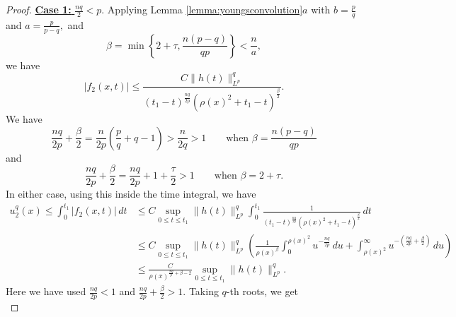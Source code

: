 \documentclass[12pt]{amsart}
\renewcommand{\1}{{\mathbf 1}}
\theoremstyle{others}
\numberwithin{equation}{section}
\begin{document}
\begin{proof}
     
 \noindent \underline{{\bf Case 1:} $\frac{nq}{2} < p.$} Applying Lemma \ref{lemma:youngsconvolution}$a$ with $b = \frac{p}{q}$ and $a = \frac{p}{p - q},$ and
 \begin{equation}\label{Secondtermbetarestriction}
     \beta = \min \left\{ 2 + \tau, \frac{n (p - q)}{qp} \right\} < \frac{n}{a},
 \end{equation}
 we have
        \begin{equation}
            |f_2(x,t)| \leq \frac{C \|h(t) \|_{L^p}^q }{ \left( t_1 - t \right)^{\frac{nq}{2p}} \left( \rho(x)^2 + t_1 - t \right)^{\frac{\beta}{2}} }.
        \end{equation}
        We have
        \begin{equation}\label{dumbbetacalc}
            \frac{nq}{2p} + \frac{\beta}{2} = \frac{n}{2p}\left( \frac{p}{q} + q - 1 \right) > \frac{n}{2q} > 1 \qquad \text{when } \beta = \frac{n (p - q)}{qp}
        \end{equation}
        and 
        \begin{equation}
            \frac{nq}{2p} + \frac \beta 2 = \frac{nq}{2p} + 1+ \frac \tau2 > 1 \qquad \text{when } \beta = 2+ \tau.
        \end{equation}
     In either case, using this inside the time integral, we have
     \begin{equation*}
     \begin{split}
         u_2^q(x) \leq \int_0^{t_1} |f_2(x,t)| \, dt %
         & \leq C \sup_{0 \leq t \leq t_1} \|h(t) \|_{L^p}^q \int_0^{t_1} \frac{1}{ \left( t_1 - t \right)^{\frac{nq}{2p}} \left( \rho(x)^2 + t_1 - t \right)^{\frac{\beta}{2} }} \, dt \\
         & \leq C \sup_{0 \leq t \leq t_1} \|h(t) \|_{L^p}^q \left( \frac{1}{\rho(x)^{ \beta} } \int_0^{\rho(x)^2}  u^{-\frac{nq}{2p}} \, du + \int_{\rho(x)^2}^\infty u^{-\left( \frac{nq}{2p} + \frac{\beta}{2} \right) } \, du \right) \\
         & \leq \frac{C}{\rho(x)^{\frac{n q}{p} + \beta - 2} } \sup_{0 \leq t \leq t_1} \|h(t) \|_{L^p}^q.
         \end{split}
     \end{equation*}
     Here we have used $\frac{nq}{2p} < 1$ and $\frac{nq}{2p} + \frac{\beta}{2} > 1.$
     Taking $q$-th roots, we get
          \begin{equation}\label{u2xest}

\end{equation}
\end{proof}
\end{document}

